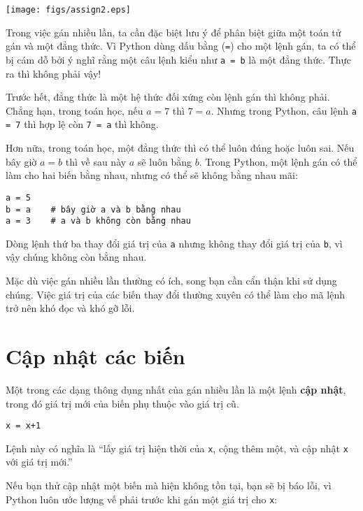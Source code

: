 \documentclass[11pt]{book}
\begin{document}

\beforefig
\centerline{\texttt{[image: figs/assign2.eps]}}
\afterfig

Trong việc gán nhiều lần, ta cần đặc biệt lưu ý để phân biệt giữa một
toán tử gán và một đẳng thức. Vì Python dùng dấu bằng ({\tt =}) 
cho một lệnh gán, ta có thể bị cám dỗ bởi ý nghĩ rằng một câu lệnh 
kiểu như  {\tt a = b} là một đẳng thức. Thực ra thì không phải vậy!


Trước hết, đẳng thức là một hệ thức đối xứng còn lệnh gán thì không phải.
Chẳng hạn, trong toán học, nếu $a = 7$ thì $7 = a$.  Nhưng trong Python, 
câu lệnh {\tt a = 7} thì hợp lệ còn {\tt 7 = a} thì không.

Hơn nữa, trong toán học, một đẳng thức thì có thể luôn đúng hoặc luôn sai.
Nếu bây giờ $a = b$ thì về sau này $a$ sẽ luôn bằng $b$. Trong Python,
một lệnh gán có thể làm cho hai biến bằng nhau, nhưng có thể sẽ không
bằng nhau mãi:

\beforeverb
\begin{verbatim}
a = 5
b = a    # bây giờ a và b bằng nhau
a = 3    # a và b không còn bằng nhau 
\end{verbatim}
\afterverb
%
Dòng lệnh thứ ba thay đổi giá trị của {\tt a} nhưng không thay đổi
giá trị của {\tt b}, vì vậy chúng không còn bằng nhau.

Mặc dù việc gán nhiều lần thường có ích, song bạn cần cẩn thận khi
sử dụng chúng. Việc giá trị của các biến thay đổi thường xuyên có thể
làm cho mã lệnh trở nên khó đọc và khó gỡ lỗi.


\section{Cập nhật các biến}
\label{update}


Một trong các dạng thông dụng nhất của gán nhiều lần là một lệnh
{\bf cập nhật}, trong đó giá trị mới của biến phụ thuộc vào giá trị
cũ.

\beforeverb
\begin{verbatim}
x = x+1
\end{verbatim}
\afterverb
%
Lệnh này có nghĩa là ``lấy giá trị hiện thời của {\tt x}, cộng thêm một,
và cập nhật {\tt x} với giá trị mới.''

Nếu bạn thử cập nhật một biến mà hiện không tồn tại, bạn sẽ bị 
báo lỗi, vì Python luôn ước lượng vế phải trước khi gán một
giá trị cho {\tt x}:
\end{document}
